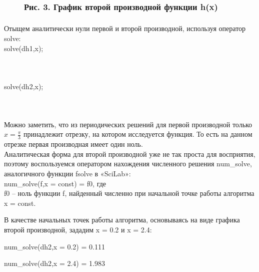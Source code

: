\documentclass[russian,utf8,nocolumnxxxi,nocolumnxxxii]{eskdtext}
\begin{document}
\begin{figure}[H]
\begin{center}
\begin{minipage}[h]{0.70\linewidth}
  \\
\frametitle{Рис. 3. График второй производной функции h(x)}
\frametitle{}
\end{minipage}
\end{center}
\end{figure}
Отыщем аналитически нули первой и второй производной, используя оператор solve:\\
solve(dh1,x);
\newpage
\begin{figure}[H]
\begin{center}
\begin{minipage}[h]{0.70\linewidth}
  \\
\frametitle{}
\frametitle{}
\end{minipage}
\end{center}
\end{figure}
solve(dh2,x);

\begin{figure}[H]
\begin{center}
\begin{minipage}[h]{0.70\linewidth}
  \\
\frametitle{}
\frametitle{}
\end{minipage}
\end{center}
\end{figure}

Можно заметить, что из периодических решений для первой производной только $x=\frac{\pi}{3}$ принадлежит отрезку, на котором исследуется функция. То есть на данном отрезке первая производная имеет один ноль.\\
Аналитическая форма для второй производной уже не так проста для восприятия, поэтому воспользуемся оператором нахождения численного решения num\_solve, аналогичного функции fsolve в «SciLab»:\\
num\_solve(f,x = const) = f0, где\\

f0 – ноль функции f, найденный численно при начальной точке работы алгоритма x = const.

В качестве начальных точек работы алгоритма, основываясь на виде графика второй производной, зададим x = 0.2 и x = 2.4:

num\_solve(dh2,x = 0.2) = 0.111

num\_solve(dh2,x = 2.4) = 1.983
\end{document}
